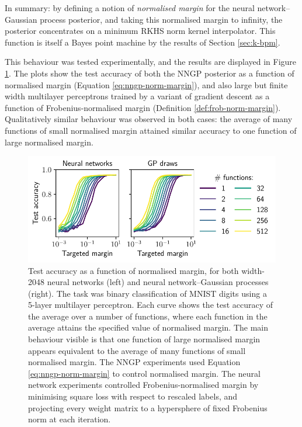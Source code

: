 \begin{refsection}
In summary: by defining a notion of \textit{normalised margin} for the neural network--Gaussian process posterior, and taking this normalised margin to infinity, the posterior concentrates on a minimum RKHS norm kernel interpolator. This function is itself a Bayes point machine by the results of Section \ref{sec:k-bpm}. 

This behaviour was tested experimentally, and the results are displayed in Figure \ref{fig:nn-margin}. The plots show the test accuracy of both the NNGP posterior as a function of normalised margin (Equation \ref{eq:nngp-norm-margin}), and also large but finite width multilayer perceptrons trained by a variant of gradient descent as a function of Frobenius-normalised margin (Definition \ref{def:frob-norm-margin}). Qualitatively similar behaviour was observed in both cases: the average of many functions of small normalised margin attained similar accuracy to one function of large normalised margin. 
\begin{figure}[p]
    \centering
    \includegraphics{figures/ensemble.pdf}
    \caption[Test accuracy as a function of normalised margin]{Test accuracy as a function of normalised margin, for both width-2048 neural networks (left) and neural network--Gaussian processes (right). The task was binary classification of MNIST digits \citep{lecun2010mnist} using a 5-layer multilayer perceptron. Each curve shows the test accuracy of the average over a number of functions, where each function in the average attains the specified value of normalised margin. The main behaviour visible is that one function of large normalised margin appears equivalent to the average of many functions of small normalised margin. The NNGP experiments used Equation \ref{eq:nngp-norm-margin} to control normalised margin. The neural network experiments controlled Frobenius-normalised margin by minimising square loss with respect to rescaled labels, and projecting every weight matrix to a hypersphere of fixed Frobenius norm at each iteration.}
    \label{fig:nn-margin}
\end{figure}\clearpage


\end{refsection}
